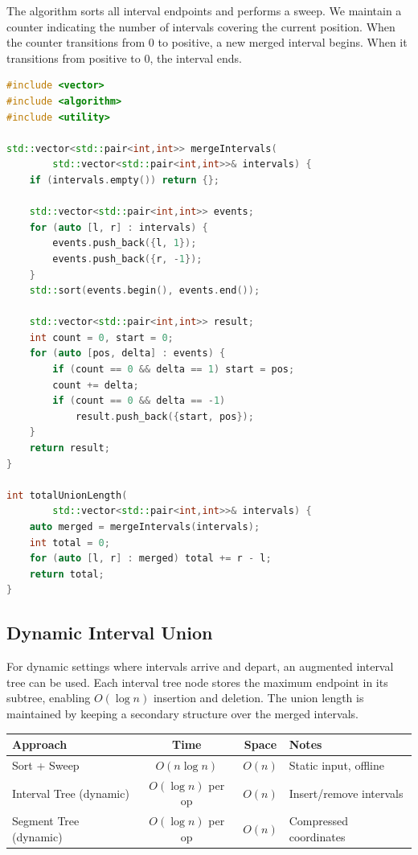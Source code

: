 The algorithm sorts all interval endpoints and performs a sweep. We maintain a counter indicating the number of intervals covering the current position. When the counter transitions from 0 to positive, a new merged interval begins. When it transitions from positive to 0, the interval ends.

\begin{lstlisting}[language=C++]
#include <vector>
#include <algorithm>
#include <utility>

std::vector<std::pair<int,int>> mergeIntervals(
        std::vector<std::pair<int,int>>& intervals) {
    if (intervals.empty()) return {};

    std::vector<std::pair<int,int>> events;
    for (auto [l, r] : intervals) {
        events.push_back({l, 1});
        events.push_back({r, -1});
    }
    std::sort(events.begin(), events.end());

    std::vector<std::pair<int,int>> result;
    int count = 0, start = 0;
    for (auto [pos, delta] : events) {
        if (count == 0 && delta == 1) start = pos;
        count += delta;
        if (count == 0 && delta == -1)
            result.push_back({start, pos});
    }
    return result;
}

int totalUnionLength(
        std::vector<std::pair<int,int>>& intervals) {
    auto merged = mergeIntervals(intervals);
    int total = 0;
    for (auto [l, r] : merged) total += r - l;
    return total;
}
\end{lstlisting}

\subsection{Dynamic Interval Union}

For dynamic settings where intervals arrive and depart, an augmented interval tree can be used. Each interval tree node stores the maximum endpoint in its subtree, enabling $O(\log n)$ insertion and deletion. The union length is maintained by keeping a secondary structure over the merged intervals.

\begin{center}
\begin{tabular}{lccl}
\toprule
Approach & Time & Space & Notes \\
\midrule
Sort + Sweep & $O(n \log n)$ & $O(n)$ & Static input, offline \\
Interval Tree (dynamic) & $O(\log n)$ per op & $O(n)$ & Insert/remove intervals \\
Segment Tree (dynamic) & $O(\log n)$ per op & $O(n)$ & Compressed coordinates \\
\bottomrule
\end{tabular}
\end{center}

